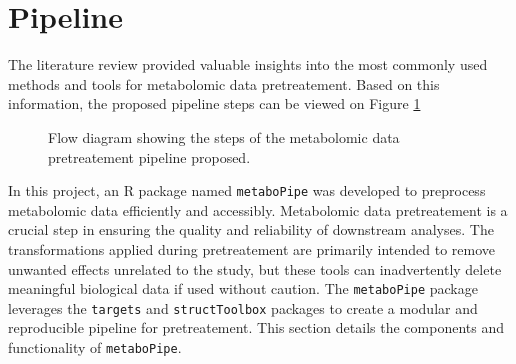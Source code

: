 \documentclass[ENG, BIB]{TFUOC}%
\begin{document}
\section{Pipeline}
The literature review provided valuable insights into the most commonly used methods and tools for metabolomic data pretreatement. Based on this information, the proposed pipeline steps can be viewed on Figure \ref{fig:pipeline}
\begin{figure}[ht]
    \centering
    \caption{Flow diagram showing the steps of the metabolomic data pretreatement pipeline proposed.}
    \label{fig:pipeline}
\end{figure}

In this project, an R package named \texttt{metaboPipe} was developed to preprocess metabolomic data efficiently and accessibly. Metabolomic data pretreatement is a crucial step in ensuring the quality and reliability of downstream analyses. The transformations applied during pretreatement are primarily intended to remove unwanted effects unrelated to the study, but these tools can inadvertently delete meaningful biological data if used without caution. The \texttt{metaboPipe} package leverages the \texttt{targets} and \texttt{structToolbox} packages to create a modular and reproducible pipeline for pretreatement. This section details the components and functionality of \texttt{metaboPipe}.
\end{document}
